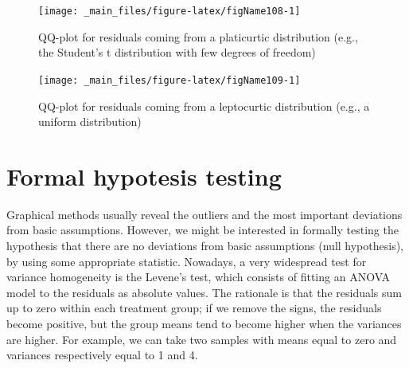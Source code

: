 \documentclass[a4paper,12pt,oneside]{book}
\begin{document}
\begin{figure}

{\centering \texttt{[image: \_main\_files/figure-latex/figName108-1]} 

}

\caption{QQ-plot for residuals coming from a platicurtic distribution (e.g., the Student's t distribution with few degrees of freedom)}\label{fig:figName108}
\end{figure}

\begin{figure}

{\centering \texttt{[image: \_main\_files/figure-latex/figName109-1]} 

}

\caption{QQ-plot for residuals coming from a leptocurtic distribution (e.g., a uniform distribution)}\label{fig:figName109}
\end{figure}

\hypertarget{formal-hypotesis-testing}{%
\section{Formal hypotesis testing}\label{formal-hypotesis-testing}}

Graphical methods usually reveal the outliers and the most important deviations from basic assumptions. However, we might be interested in formally testing the hypothesis that there are no deviations from basic assumptions (null hypothesis), by using some appropriate statistic. Nowadays, a very widespread test for variance homogeneity is the Levene's test, which consists of fitting an ANOVA model to the residuals as absolute values. The rationale is that the residuals sum up to zero within each treatment group; if we remove the signs, the residuals become positive, but the group means tend to become higher when the variances are higher. For example, we can take two samples with means equal to zero and variances respectively equal to 1 and 4.
\end{document}
